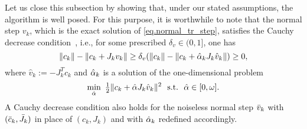 Let us close this subsection by showing that, under our stated assumptions, the algorithm is well posed.  For this purpose, it is worthwhile to note that the normal step $v_k$, which is the exact solution of \eqref{eq.normal_tr_step}, satisfies the Cauchy decrease condition~\cite{nocedal1999numerical}, i.e., for some prescribed $\delta_v \in (0,1]$, one has
\begin{equation}\label{eq.cauchy_dec}
  \|c_k \| - \|c_k + J_k v_k \| \geq \delta_v (\|c_k\| - \|c_k + {\hat \alpha}_k J_k \hat v_k\|) \geq 0,
\end{equation}
where $\hat v_k := - J_k^T c_k$ and ${\hat \alpha}_k$ is a solution of the one-dimensional problem
\begin{equation}\label{eq.bar_alpha}
  \min_{\alphahat}\ \tfrac{1}{2} \|c_k + \alphahat J_k \hat v_k \|^2\ \ \st \ \ \alphahat \in [0,\omega].
\end{equation}
A Cauchy decrease condition also holds for the noiseless normal step ${\bar v}_k$ with $({\bar c}_k,{\bar J}_k)$ in place of $(c_k,J_k)$ and with ${\hat \alpha}_k$ redefined accordingly.

